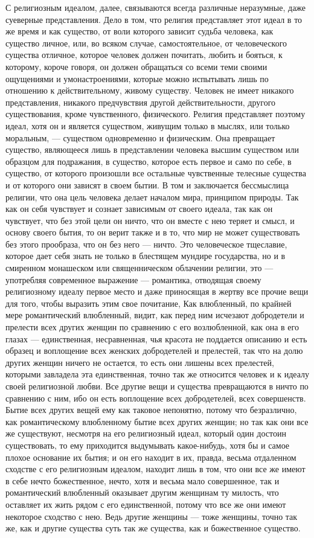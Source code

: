 \documentclass[12pt]{article}
\begin{document}
С религиозным идеалом, далее, связываются всегда различные неразумные, даже суеверные представления. Дело в том, что религия представляет этот идеал в то же время и как существо, от воли которого зависит судьба человека, как существо личное, или, во всяком случае, самостоятельное, от человеческого существа отличное, которое человек должен почитать, любить и бояться, к которому, короче говоря, он должен обращаться со всеми теми своими ощущениями и умонастроениями, которые можно испытывать лишь по отношению к действительному, живому существу. Человек не имеет никакого представления, никакого предчувствия другой действительности, другого существования, кроме чувственного, физического. Религия представляет поэтому идеал, хотя он и является существом, живущим только в мыслях, или только моральным, --- существом одновременно и физическим. Она превращает существо, являющееся лишь в представлении человека высшим существом или образцом для подражания, в существо, которое есть первое и само по себе, в существо, от которого произошли все остальные чувственные телесные существа и от которого они зависят в своем бытии. В том и заключается бессмыслица религии, что она цель человека делает началом мира, принципом природы. Так как он себя чувствует и сознает зависимым от своего идеала, так как он чувствует, что без этой цели он ничто, что он вместе с нею теряет и смысл, и основу своего бытия, то он верит также и в то, что мир не может существовать без этого прообраза, что он без него --- ничто. Это человеческое тщеславие, которое дает себя знать не только в блестящем мундире государства, но и в смиренном монашеском или священническом облачении религии, это --- употребляя современное выражение --- романтика, отводящая своему религиозному идеалу первое место и даже приносящая в жертву все прочие вещи для того, чтобы выразить этим свое почитание, Как влюбленный, по крайней мере романтический влюбленный, видит, как перед ним исчезают добродетели и прелести всех других женщин по сравнению с его возлюбленной, как она в его глазах --- единственная, несравненная, чья красота не поддается описанию и есть образец и воплощение всех женских добродетелей и прелестей, так что на долю других женщин ничего не остается, то есть они лишены всех прелестей, которыми завладела эта единственная, точно так же относится человек и к идеалу своей религиозной любви. Все другие вещи и существа превращаются в ничто по сравнению с ним, ибо он есть воплощение всех добродетелей, всех совершенств. Бытие всех других вещей ему как таковое непонятно, потому что безразлично, как романтическому влюбленному бытие всех других женщин; но так как они все же существуют, несмотря на его религиозный идеал, который один достоин существовать, то ему приходится выдумывать какое-нибудь, хотя бы и самое плохое основание их бытия; и он его находит в их, правда, весьма отдаленном сходстве с его религиозным идеалом, находит лишь в том, что они все же имеют в себе нечто божественное, нечто, хотя и весьма мало совершенное, так и романтический влюбленный оказывает другим женщинам ту милость, что оставляет их жить рядом с его единственной, потому что все же они имеют некоторое сходство с нею. Ведь другие женщины --- тоже женщины, точно так же, как и другие существа суть так же существа, как и божественное существо. 
\end{document}
